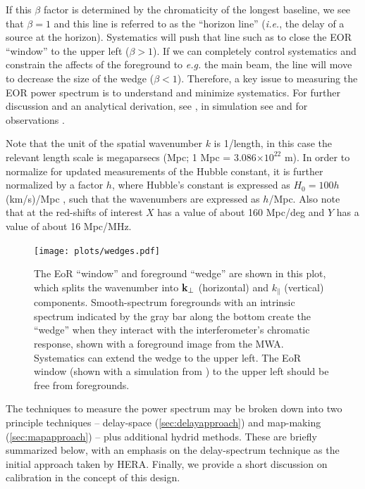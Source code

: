 \documentclass[preprint,11pt]{aastex}
\newcommand{\kvec}{{\bf k}}
\newcommand{\kvpr}{{\kvec_\perp}}
\def\kpar{k_{\|}}
\begin{document}
If this $\beta$ factor is determined by the chromaticity of the longest baseline, we see that $\beta=1$ and this line is referred to as the ``horizon line'' ({\em i.e.}, the delay of a source at the horizon).  Systematics will push that line such as to close the EOR ``window'' to the upper left ($\beta > 1$).  If we can completely control systematics and constrain the affects of the foreground to {\em e.g.} the main beam, the line will move to decrease the size of the wedge ($\beta<1$).
Therefore, a key issue to measuring the EOR power spectrum is to understand and minimize systematics.  For further discussion and an analytical derivation, see \cite{zahn_etal2012,vedantham_2012,liu_et_al2014b},  in simulation see \cite{datta_etal2010,hazelton_et_al2013} and for observations
\cite{pober_etal2013b,2015arXiv150601026P,parsons_etal2014,2015arXiv150206016A}.  

Note that the unit of the spatial wavenumber $k$ is 1/length, in this case the relevant length scale is megaparsecs (Mpc; 1 Mpc = 3.086$\times10^{22}$ m).  In order to normalize for updated measurements of the Hubble constant, it is further normalized by a factor $h$, where Hubble's constant is expressed as $H_0=100h$ (km/s)/Mpc , such that the wavenumbers are expressed as $h$/Mpc.  Also note that at the red-shifts of interest $X$ has a value of about 160 Mpc/deg and $Y$ has a value of about 16 Mpc/MHz.

\begin{figure}[t]
\centerline{
\texttt{[image: plots/wedges.pdf]}
}
\caption{The EoR ``window'' and foreground ``wedge'' are shown in this plot, which splits the wavenumber into $\kvpr$ (horizontal) and $\kpar$ (vertical) components.
Smooth-spectrum foregrounds with an intrinsic spectrum indicated by the gray bar along the bottom create the ``wedge'' when they interact with the interferometer's chromatic response, shown with a foreground image from the MWA.  Systematics can extend the wedge to the upper left.  The EoR window (shown with a simulation
from \citealt{mesinger_et_al2011}) to the upper left should be free from foregrounds.}
\label{fig:wedge}
\end{figure}

The techniques to measure the power spectrum may be broken down into two principle techniques -- delay-space (\ref{sec:delayapproach}) and map-making (\ref{sec:mapapproach}) -- plus additional hydrid methods.  These are briefly summarized below, with an emphasis on the delay-spectrum technique as the initial approach taken by HERA.  Finally, we provide a short discussion on calibration in the concept of this design.
\end{document}
